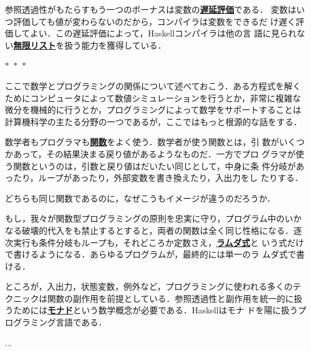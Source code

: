 \documentclass[a5paper,twoside,fleqn]{jsbook}
\newcommand{\separator}{\begin{center}$*$~$*$~$*$\end{center}}
\newcommand{\programminglanguage}[1]{\textsf{#1}}
\newcommand{\clang}{\programminglanguage{C}}
\newcommand{\clangkr}{\programminglanguage{K\&R~C}}
\newcommand{\haskell}{\programminglanguage{Haskell}}
\newcommand{\keyword}[1]{{\underline{\textbf{#1}}}}
\newcommand{\code}[1]{\texttt{#1}}
\newenvironment{ccode}{\begin{itembox}[r]{\clang}}{\end{itembox}}
\newenvironment{ckrcode}{\begin{itembox}[r]{\clangkr}}{\end{itembox}}
\begin{document}
参照透過性がもたらすもう一つのボーナスは変数の\keyword{遅延評価}である．
変数はいつ評価しても値が変わらないのだから，コンパイラは変数をできるだ
け遅く評価してよい．この遅延評価によって，\haskell コンパイラは他の言
語に見られない\keyword{無限リスト}を扱う能力を獲得している．

\separator

ここで数学とプログラミングの関係について述べておこう．ある方程式を解く
ためにコンピュータによって数値シミュレーションを行うとか，非常に複雑な
微分を機械的に行うとか，プログラミングによって数学をサポートすることは
計算機科学の主たる分野の一つであるが，ここではもっと根源的な話をする．

数学者もプログラマも\keyword{関数}をよく使う．数学者が使う関数とは，引
数がいくつかあって，その結果決まる戻り値があるようなものだ．一方でプロ
グラマが使う関数というのは，引数と戻り値はだいたい同じとして，中身に条
件分岐があったり，ループがあったり，外部変数を書き換えたり，入出力をし
たりする．

どちらも同じ関数であるのに，なぜこうもイメージが違うのだろうか．

もし，我々が関数型プログラミングの原則を忠実に守り，プログラム中のいか
なる破壊的代入をも禁止するとすると，両者の関数は全く同じ性格になる．逐
次実行も条件分岐もループも，それどころか定数さえ，\keyword{ラムダ式}と
いう式だけで書けるようになる．あらゆるプログラムが，最終的には単一のラ
ムダ式で書ける．

ところが，入出力，状態変数，例外など，プログラミングに使われる多くのテ
クニックは関数の副作用を前提としている．参照透過性と副作用を統一的に扱
うためには\keyword{モナド}という数学概念が必要である．\haskell はモナ
ドを陽に扱うプログラミング言語である．

... %





\end{document}
